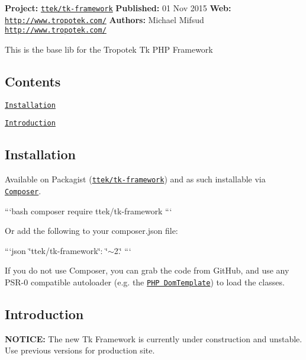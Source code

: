 {\bfseries Project\+:} \href{http://packagist.org/packages/ttek/tk-framework}{\tt ttek/tk-\/framework} {\bfseries Published\+:} 01 Nov 2015 {\bfseries Web\+:} \href{http://www.tropotek.com/}{\tt http\+://www.\+tropotek.\+com/} {\bfseries Authors\+:} Michael Mifsud \href{http://www.tropotek.com/}{\tt http\+://www.\+tropotek.\+com/}

This is the base lib for the Tropotek Tk P\+H\+P Framework

\subsection*{Contents}


\begin{DoxyItemize}
\item \href{#installation}{\tt Installation}
\item \href{#introduction}{\tt Introduction}
\end{DoxyItemize}

\subsection*{Installation}

Available on Packagist (\href{http://packagist.org/packages/ttek/tk-framework}{\tt ttek/tk-\/framework}) and as such installable via \href{http://getcomposer.org/}{\tt Composer}.

```bash composer require ttek/tk-\/framework ```

Or add the following to your composer.\+json file\+:

```json \char`\"{}ttek/tk-\/framework\char`\"{}\+: \char`\"{}$\sim$2.\char`\"{} ```

If you do not use Composer, you can grab the code from Git\+Hub, and use any P\+S\+R-\/0 compatible autoloader (e.\+g. the \href{https://github.com/tropotek/tk-framework}{\tt P\+H\+P Dom\+Template}) to load the classes.

\subsection*{Introduction}

{\bfseries N\+O\+T\+I\+C\+E\+:} The new Tk Framework is currently under construction and unstable. Use previous versions for production site. 